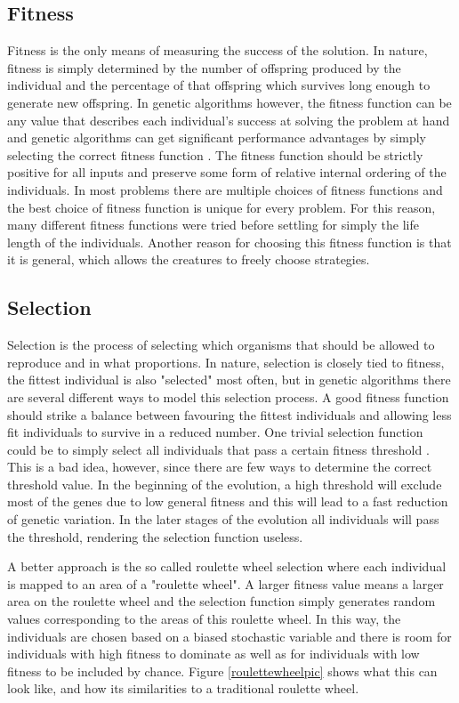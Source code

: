 \documentclass[a4paper,11pt]{kth-mag}
\begin{document}
\subsection{Fitness}
Fitness is the only means of measuring the success of the solution. In nature, fitness is simply determined by the number of offspring produced by the individual and the percentage of that offspring which survives long enough to generate new offspring. In genetic algorithms however, the fitness function can be any value that describes each individual's success at solving the problem at hand and genetic algorithms can get significant performance advantages by simply selecting the correct fitness function \cite{marsland}. The fitness function should be strictly positive for all inputs and preserve some form of relative internal ordering of the individuals. In most problems there are multiple choices of fitness functions and the best choice of fitness function is unique for every problem. For this reason, many different fitness functions were tried before settling for simply the life length of the individuals. Another reason for choosing this fitness function is that it is general, which allows the creatures to freely choose strategies.

\subsection{Selection}
Selection is the process of selecting which organisms that should be allowed to reproduce and in what proportions. In nature, selection is closely tied to fitness, the fittest individual is also "selected" most often, but in genetic algorithms there are several different ways to model this selection process. A good fitness function should strike a balance between favouring the fittest individuals and allowing less fit individuals to survive in a reduced number.  One trivial selection function could be to simply select all individuals that pass a certain fitness threshold \cite{marsland}. This is a bad idea, however, since there are few ways to determine the correct threshold value. In the beginning of the evolution, a high threshold will exclude most of the genes due to low general fitness and this will lead to a fast reduction of genetic variation. In the later stages of the evolution all individuals will pass the threshold, rendering the selection function useless.

A better approach is the so called roulette wheel selection where each individual is mapped to an area of a "roulette wheel". A larger fitness value means a larger area on the roulette wheel and the selection function simply generates random values corresponding to the areas of this roulette wheel. In this way, the individuals are chosen based on a biased stochastic variable and there is room for individuals with high fitness to dominate as well as for individuals with low fitness to be included by chance. Figure \ref{roulettewheelpic} shows what this can look like, and how its similarities to a traditional roulette wheel.
\end{document}
